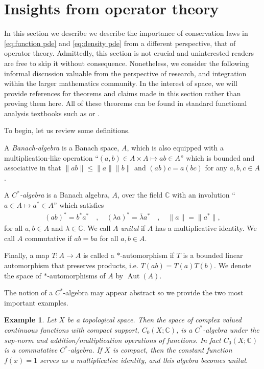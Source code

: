 \documentclass[final,leqno]{siamltex1213}
\newtheorem{example}[theorem]{Example}
\begin{document}
\section{Insights from operator theory}

In this section we describe we describe the importance of conservation laws in \eqref{eq:function pde} and \eqref{eq:density pde} from a different perspective, that of operator theory.
Admittedly, this section is not crucial and
uninterested readers are free to skip it without consequence.
Nonetheless, we consider the following informal discussion valuable from the perspective of research, and integration within the larger mathematics community.
In the interest of space, we will provide references for theorems and claims made in this section rather than proving them here.
All of these theorems can be found in standard functional analysis textbooks such as \cite{Conway1990} or \cite{Rudin1991}.

To begin, let us review some definitions.
\begin{definition}
	A \emph{Banach-algebra} is a Banach space, $A$, which is also equipped with a multiplication-like operation ``$(a,b) \in A \times A \mapsto ab \in A$''
	which is bounded and associative in that $\| ab \| \leq \|a \| \|b \|$ and $(ab)c = a(bc)$ for any $a,b,c \in A$.
	
	A \emph{$C^{*}$-algebra} is a Banach algebra, $A$, over the field $\mathbb{C}$ with an involution ``$a \in A \mapsto a^{*} \in A$'' which satisfies
	\begin{align}
		(ab)^{*} = b^{*} a^{*} \quad,\quad
		(\lambda a)^{*} = \bar{\lambda} a^{*} \quad,\quad
		\| a \| = \| a^{*}\|,
	\end{align}
	for all $a,b \in A$ and $\lambda \in \mathbb{C}$.
	We call $A$ \emph{unital} if $A$ has a multiplicative identity.
	We call $A$ commutative if $ab = ba$ for all $a,b \in A$.
	
	Finally, a map $T:A \to A$ is called a $*$-automorphism if $T$ is a bounded linear automorphism that preserves products, i.e. $T(ab) = T(a) T(b)$.
	We denote the space of $*$-automorphisms of $A$ by $\operatorname{Aut}(A)$.
\end{definition}

The notion of a $C^{*}$-algebra may appear abstract so we provide the two most important examples.

\begin{example} \label{ex:function algebra}
	Let $X$ be a topological space.  Then the space of complex valued continuous functions with compact support, $C_{0}(X;\mathbb{C})$, is a $C^{*}$-algebra under the sup-norm and addition/multiplication operations of functions.
	In fact $C_{0}(X;\mathbb{C})$ is a commutative $C^{*}$-algebra.  If $X$ is compact, then the constant function $f(x) = 1$ serves as a multiplicative identity, and this algebra becomes unital.
\end{example}
\end{document}

